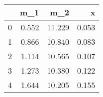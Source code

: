 \begin{tabular}{lrrr}
\toprule
{} &   m\_1 &    m\_2 &     x \\
\midrule
0 & 0.552 & 11.229 & 0.053 \\
1 & 0.866 & 10.840 & 0.083 \\
2 & 1.114 & 10.565 & 0.107 \\
3 & 1.273 & 10.380 & 0.122 \\
4 & 1.644 & 10.205 & 0.155 \\
\bottomrule
\end{tabular}
